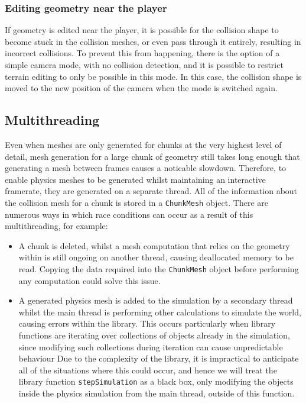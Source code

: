 \documentclass{article}
\begin{document}
\subsubsection{Editing geometry near the player}
If geometry is edited near the player, it is possible for the collision shape to become stuck in the collision meshes, or even pass through it entirely, resulting in incorrect collisions. To prevent this from happening, there is the option of a simple camera mode, with no collision detection, and it is possible to restrict terrain editing to only be possible in this mode. In this case, the collision shape is moved to the new position of the camera when the mode is switched again. %
\subsection{Multithreading}
Even when meshes are only generated for chunks at the very highest level of detail, mesh generation for a large chunk of geometry still takes long enough that generating a mesh between frames causes a noticable slowdown. Therefore, to enable physics meshes to be generated whilst maintaining an interactive framerate, they are generated on a separate thread. All of the information about the collision mesh for a chunk is stored in a \texttt{ChunkMesh} object. There are numerous ways in which race conditions can occur as a result of this multithreading, for example:
\begin{itemize}
  \item A chunk is deleted, whilst a mesh computation that relies on the geometry within is still ongoing on another thread, causing deallocated memory to be read. Copying the data required into the \texttt{ChunkMesh} object before performing any computation could solve this issue.
  \item A generated physics mesh is added to the simulation by a secondary thread whilst the main thread is performing other calculations to simulate the world, causing errors within the library. This occurs particularly when library functions are iterating over collections of objects already in the simulation, since modifying such collections during iteration can cause unpredictable behaviour Due to the complexity of the library, it is impractical to anticipate all of the situations where this could occur, and hence we will treat the library function \texttt{stepSimulation} as a black box, only modifying the objects inside the physics simulation from the main thread, outside of this function.
\end{itemize}
\end{document}
